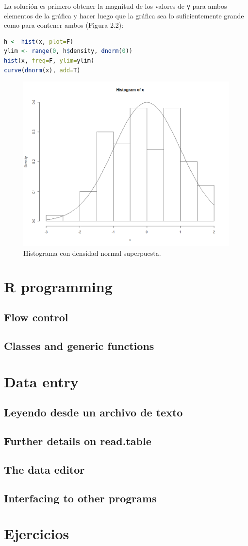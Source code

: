 La solución es primero obtener la magnitud de los valores de \texttt{y} para ambos
elementos de la gráfica y hacer luego  que la gráfica sea lo suficientemente grande
como para contener ambos (Figura 2.2):

\begin{lstlisting}[language=R]
h <- hist(x, plot=F)
ylim <- range(0, h$density, dnorm(0))
hist(x, freq=F, ylim=ylim)
curve(dnorm(x), add=T)
\end{lstlisting}

\begin{figure}[H]
  \includegraphics[width=\linewidth]{fig-6.png}
  \caption{Histograma con densidad normal superpuesta.}
  \label{fig:fig-6}
\end{figure}


\newpage

\section{R programming}
\subsection{Flow control} \label{flowcontrol}
\subsection{Classes and generic functions}

\section{Data entry}
\subsection{Leyendo desde un archivo de texto} \label{readtextfile}
\subsection{Further details on read.table}
\subsection{The data editor}
\subsection{Interfacing to other programs}
\section{Ejercicios}
